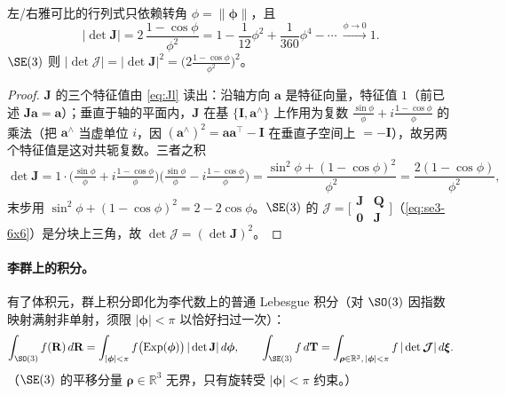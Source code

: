 \begin{theorem}[$\SO(3)$ 体积元的闭式]\label{thm:detJ}
左/右雅可比的行列式只依赖转角 $\phi=\|\boldsymbol{\phi}\|$，且
\begin{equation}
  |\det\mathbf{J}|=2\,\frac{1-\cos\phi}{\phi^2}
  =1-\frac{1}{12}\phi^2+\frac{1}{360}\phi^4-\cdots\ \xrightarrow{\phi\to0}1.
  \label{eq:detJ}
\end{equation}
$\SE(3)$ 则 $|\det\boldsymbol{\mathcal{J}}|=|\det\mathbf{J}|^2=\big(2\tfrac{1-\cos\phi}{\phi^2}\big)^2$。
\end{theorem}
\begin{proof}
$\mathbf{J}$ 的三个特征值由 \cref{eq:Jl} 读出：沿轴方向 $\mathbf{a}$ 是特征向量，特征值 $1$（前已述 $\mathbf{J}\mathbf{a}=\mathbf{a}$）；垂直于轴的平面内，$\mathbf{J}$ 在基 $\{\mathbf{I},\mathbf{a}^\wedge\}$ 上作用为复数 $\tfrac{\sin\phi}{\phi}+i\tfrac{1-\cos\phi}{\phi}$ 的乘法（把 $\mathbf{a}^\wedge$ 当虚单位 $i$，因 $(\mathbf{a}^\wedge)^2=\mathbf{a}\mathbf{a}^\top-\mathbf{I}$ 在垂直子空间上 $=-\mathbf{I}$），故另两个特征值是这对共轭复数。三者之积
\[
  \det\mathbf{J}=1\cdot\Big(\tfrac{\sin\phi}{\phi}+i\tfrac{1-\cos\phi}{\phi}\Big)\Big(\tfrac{\sin\phi}{\phi}-i\tfrac{1-\cos\phi}{\phi}\Big)
  =\frac{\sin^2\phi+(1-\cos\phi)^2}{\phi^2}=\frac{2(1-\cos\phi)}{\phi^2},
\]
末步用 $\sin^2\phi+(1-\cos\phi)^2=2-2\cos\phi$。$\SE(3)$ 的 $\boldsymbol{\mathcal{J}}=\big[\begin{smallmatrix}\mathbf{J}&\mathbf{Q}\\\mathbf{0}&\mathbf{J}\end{smallmatrix}\big]$（\cref{eq:se3-6x6}）是分块上三角，故 $\det\boldsymbol{\mathcal{J}}=(\det\mathbf{J})^2$。
\end{proof}

\paragraph{李群上的积分。}有了体积元，群上积分即化为李代数上的普通 Lebesgue 积分（对 $\SO(3)$ 因指数映射满射非单射，须限 $|\boldsymbol{\phi}|<\pi$ 以恰好扫过一次）：
\begin{equation}
  \int_{\SO(3)}f(\mathbf{R})\,d\mathbf{R}=\int_{|\boldsymbol{\phi}|<\pi}f\big(\mathrm{Exp}(\boldsymbol{\phi})\big)\,|\det\mathbf{J}|\,d\boldsymbol{\phi},\qquad
  \int_{\SE(3)}f\,d\mathbf{T}=\int_{\boldsymbol{\rho}\in\mathbb{R}^3,\,|\boldsymbol{\phi}|<\pi}f\,|\det\boldsymbol{\mathcal{J}}|\,d\boldsymbol{\xi}.
  \label{eq:lie-integral}
\end{equation}
（$\SE(3)$ 的平移分量 $\boldsymbol{\rho}\in\mathbb{R}^3$ 无界，只有旋转受 $|\boldsymbol{\phi}|<\pi$ 约束。）

